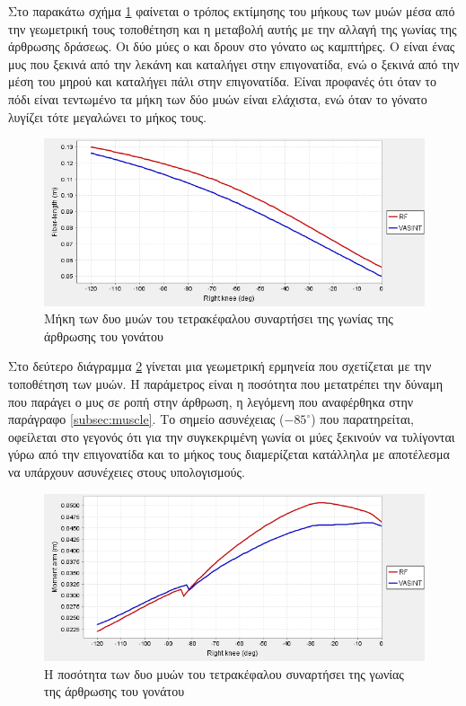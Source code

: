 Στο παρακάτω σχήμα \ref{fig:iber-length-vs-knee-angle} φαίνεται ο τρόπος εκτίμησης του μήκους των μυών μέσα από την γεωμετρική τους τοποθέτηση και η μεταβολή αυτής με την αλλαγή της γωνίας της άρθρωσης δράσεως. Οι δύο μύες ο  και  δρουν στο γόνατο ως καμπτήρες. Ο  είναι ένας μυς που ξεκινά από την λεκάνη και καταλήγει στην επιγονατίδα, ενώ  ο  ξεκινά από την μέση του μηρού και καταλήγει πάλι στην επιγονατίδα. Είναι προφανές ότι όταν το πόδι είναι τεντωμένο τα μήκη των δύο μυών είναι ελάχιστα, ενώ όταν το γόνατο λυγίζει τότε μεγαλώνει το μήκος τους.

\begin{figure}[H]
    \centering
    \includegraphics[width=0.8\linewidth, keepaspectratio]{fig/fiber-length-vs-knee-angle.png}
    \caption{Μήκη των δυο μυών του τετρακέφαλου συναρτήσει της γωνίας της άρθρωσης του γονάτου}
    \label{fig:iber-length-vs-knee-angle}
\end{figure}

Στο δεύτερο διάγραμμα \ref{fig:moment-arm-vs-knee-angle} γίνεται μια γεωμετρική ερμηνεία που σχετίζεται με την τοποθέτηση των μυών. Η παράμετρος είναι η ποσότητα που μετατρέπει την δύναμη που παράγει ο μυς σε ροπή στην άρθρωση, η λεγόμενη  που αναφέρθηκα στην παράγραφο \ref{subsec:muscle}. Το σημείο ασυνέχειας ($-85^{\circ}$) που παρατηρείται, οφείλεται στο γεγονός ότι για την συγκεκριμένη γωνία οι μύες ξεκινούν να τυλίγονται γύρω από την επιγονατίδα και το μήκος τους διαμερίζεται κατάλληλα με αποτέλεσμα να υπάρχουν ασυνέχειες στους υπολογισμούς.

\begin{figure}[H]
    \centering
    \includegraphics[width=0.8\linewidth, keepaspectratio]{fig/moment-arm-vs-knee-angle.png}
    \caption{Η ποσότητα  των δυο μυών του τετρακέφαλου συναρτήσει της γωνίας της άρθρωσης του γονάτου}
    \label{fig:moment-arm-vs-knee-angle}
\end{figure}

